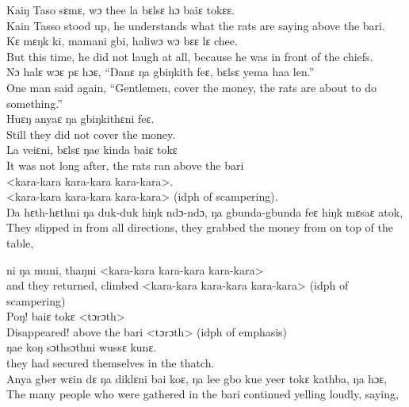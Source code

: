 Kaiŋ Taso sɛmɛ, wɔ thee la bɛlsɛ hɔ baiɛ tokɛɛ.\\
Kain Tasso stood up, he understands what the rats are saying above the bari.\\

Kɛ mɛŋk ki, mamani gbi, haliwɔ wɔ bɛɛ lɛ chee.\\
But this time, he did not laugh at all, because he was in front of the chiefs.\\

Nɔ halɛ wɔɛ pɛ hɔɛ, “Ŋanɛ ŋa gbiŋkith feɛ, bɛlsɛ yema haa len.”\\
One man said again, “Gentlemen, cover the money, the rats are about to do something.”\\

Huɛŋ anyaɛ ŋa gbiŋkithɛni feɛ.\\
Still they did not cover the money.\\

La veiɛni, bɛlsɛ ŋae kinda baiɛ tokɛ\\ 
It was not long after, the rats ran above the bari\\ 

<kara-kara kara-kara kara-kara>.\\
<kara-kara kara-kara kara-kara> (idph of scampering).\\

\largerpage
Ŋa hɛth-hɛthni ŋa duk-duk hiŋk ndɔ-ndɔ, ŋa gbunda-gbunda feɛ hiŋk mɛsaɛ atok,\\
They slipped in from all directions, they grabbed the money from on top of the table,\newpage

ni ŋa muni, thaŋni <kara-kara kara-kara kara-kara>\\
and they returned, climbed <kara-kara kara-kara kara-kara> (idph of scampering)\\ 

Poŋ! baiɛ tokɛ <tɔrɔth>\\ 
Disappeared! above the bari <tɔrɔth> (idph of emphasis)\\

ŋae koŋ sɔthsɔthni wussɛ kunɛ.\\
they had secured themselves in the thatch.\\

Anya gber wɛin dɛ ŋa diklɛni bai koɛ, ŋa lee gbo kue yeer tokɛ kathba, ŋa hɔɛ,\\
The many people who were gathered in the bari continued yelling loudly, saying,\\

